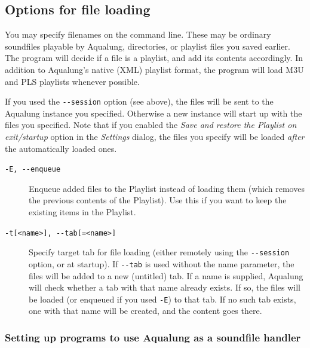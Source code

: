 \documentclass[10pt,english]{article}
\begin{document}
\subsection{Options for file loading\label{idp427552}}



\noindent You may specify filenames on the command line. These may be
ordinary soundfiles playable by Aqualung, directories, or
playlist files you saved earlier. The program will decide if a
file is a playlist, and add its contents accordingly. In
addition to Aqualung's native (XML) playlist format, the
program will load M3U and PLS playlists whenever possible.




If you used the \texttt{{-}{-}session} option (see above),
the files will be sent to the Aqualung instance you
specified. Otherwise a new instance will start up with the
files you specified. Note that if you enabled the \textsl{Save
and restore the Playlist on exit/startup} option in the
\textsl{Settings} dialog, the files you specify will be
loaded \emph{after} the automatically loaded ones.


\begin{description}

\item [
\texttt{-E, {-}{-}enqueue}
]

Enqueue added files to the Playlist instead of loading
them (which removes the previous contents of the
Playlist). Use this if you want to keep the existing items
in the Playlist.

\item [
\texttt{-t[<name>], {-}{-}tab[=<name>]}
]

Specify target tab for file loading (either remotely
using the \texttt{{-}{-}session} option, or at startup). If
\texttt{{-}{-}tab} is used without the name parameter, the
files will be added to a new (untitled) tab. If a name is
supplied, Aqualung will check whether a tab with that name
already exists. If so, the files will be loaded (or enqueued
if you used \texttt{-E}) to that tab. If no such tab
exists, one with that name will be created, and the content
goes there.

\end{description}

\subsubsection{Setting up programs to use Aqualung as a soundfile handler\label{idp436480}}
\end{document}
